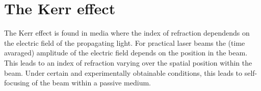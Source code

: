 \chapter{The Kerr effect}
\label{cha:kerr}

The Kerr effect is found in media where the index of refraction 
dependends on the electric field of the propagating light. For practical
laser beams the (time avaraged) amplitude of the electric
field depends on the position in the beam. This leads to an index of
refraction varying over the spatial position within the beam. Under
certain and experimentally obtainable conditions, this leads to
self-focusing of the beam within a passive medium.





